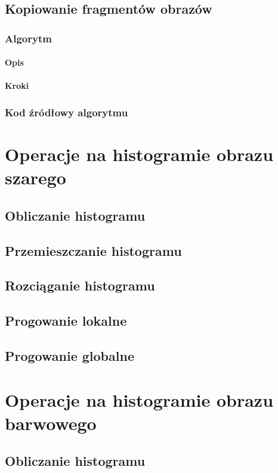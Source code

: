 \documentclass[a4paper,12pt]{book}
\begin{document}
\section{Kopiowanie fragmentów obrazów}
\subsection*{Algorytm}
\subsubsection*{Opis}
\subsubsection*{Kroki}
\subsection*{Kod źródłowy algorytmu}

\chapter{Operacje na histogramie obrazu szarego}
\section{Obliczanie histogramu}
\section{Przemieszczanie histogramu}
\section{Rozciąganie histogramu}
\section{Progowanie lokalne}
\section{Progowanie globalne}

\chapter{Operacje na histogramie obrazu barwowego}
\section{Obliczanie histogramu}
\end{document}
